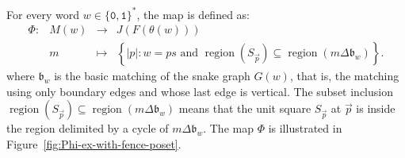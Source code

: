 \documentclass[a4paper,12pt]{amsart}
\newcommand{\bfrak}{{\mathfrak{b}}}
\newcommand{\0}{\mathtt{0}}
\newcommand{\1}{\mathtt{1}}
\newcommand{\2}{\mathtt{2}}
\newcommand{\3}{\mathtt{3}}
\DeclareMathOperator{\region}{region}
\begin{document}
For every word $w\in\{\0,\1\}^*$, the map is defined as:
\[
\begin{array}{rccl}
    \Phi:&M(w) & \to & J(F(\theta(w)))\\
    &m & \mapsto &
    \left\{|p| \colon w = ps \text{ and }
            \region(S_{\overrightarrow{p}})\subseteq \region(m\Delta\bfrak_w)
        \right\}.
\end{array}
\]
where $\bfrak_w$ is the basic matching of the snake graph $G(w)$,
that is, the matching using only boundary edges and whose last edge is vertical.
The subset inclusion
$\region(S_{\overrightarrow{p}})\subseteq \region(m\Delta\bfrak_w)$
means that the unit square $S_{\overrightarrow{p}}$ at $\overrightarrow{p}$
is inside the region delimited by a cycle of $m\Delta\bfrak_w$.
The map $\Phi$ is illustrated in Figure~\ref{fig:Phi-ex-with-fence-poset}.


%
\newcommand{\arrowR}{\tikz \draw[->] (-2pt,0) -- (2pt,0);}
\newcommand{\arrowL}{\tikz \draw[<-] (-2pt,0) -- (2pt,0);}
\end{document}
